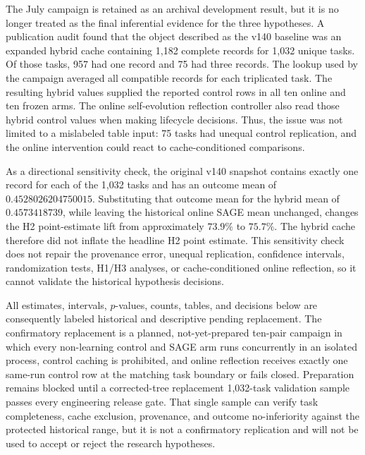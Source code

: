 The July campaign is retained as an archival development result, but it is no longer treated as the final inferential evidence for the three hypotheses. A publication audit found that the object described as the v140 baseline was an expanded hybrid cache containing 1,182 complete records for 1,032 unique tasks. Of those tasks, 957 had one record and 75 had three records. The lookup used by the campaign averaged all compatible records for each triplicated task. The resulting hybrid values supplied the reported control rows in all ten online and ten frozen arms. The online self-evolution reflection controller also read those hybrid control values when making lifecycle decisions. Thus, the issue was not limited to a mislabeled table input: 75 tasks had unequal control replication, and the online intervention could react to cache-conditioned comparisons.

As a directional sensitivity check, the original v140 snapshot contains exactly one record for each of the 1,032 tasks and has an outcome mean of $0.4528026204750015$. Substituting that outcome mean for the hybrid mean of $0.4573418739$, while leaving the historical online SAGE mean unchanged, changes the H2 point-estimate lift from approximately $73.9\%$ to $75.7\%$. The hybrid cache therefore did not inflate the headline H2 point estimate. This sensitivity check does not repair the provenance error, unequal replication, confidence intervals, randomization tests, H1/H3 analyses, or cache-conditioned online reflection, so it cannot validate the historical hypothesis decisions.

All estimates, intervals, $p$-values, counts, tables, and decisions below are consequently labeled historical and descriptive pending replacement. The confirmatory replacement is a planned, not-yet-prepared ten-pair campaign in which every non-learning control and SAGE arm runs concurrently in an isolated process, control caching is prohibited, and online reflection receives exactly one same-run control row at the matching task boundary or fails closed. Preparation remains blocked until a corrected-tree replacement 1,032-task validation sample passes every engineering release gate. That single sample can verify task completeness, cache exclusion, provenance, and outcome no-inferiority against the protected historical range, but it is not a confirmatory replication and will not be used to accept or reject the research hypotheses.

